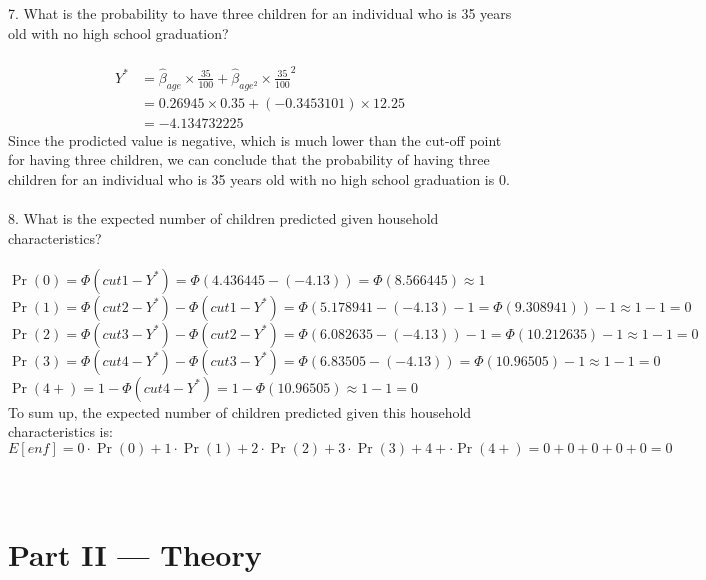 \documentclass[12pt]{article}
\begin{document}
\begin{flushleft}
7. What is the probability to have three children for an individual who is 35 years old
with no high school graduation?\\~\\
\begin{align*}
Y^*&=\hat{\beta}_{age} \times \frac{35}{100}+\hat{\beta}_{age^2} \times \frac{35}{100}^2\\
&=0.26945 \times 0.35+(-0.3453101) \times 12.25\\
&= -4.134732225
\end{align*}
Since the prodicted value is negative, which is much lower than the cut-off point for having three children, we can conclude that the probability of having three children for an individual who is 35 years old with no high school graduation is 0.\\~\\
8. What is the expected number of children predicted given household characteristics?\\~\\
$\Pr(0) = \Phi(cut1 - Y^*) = \Phi (4.436445 - (-4.13)) = \Phi(8.566445) \approx 1 $\\
$\Pr(1) = \Phi(cut2 - Y^*) - \Phi(cut1 - Y^*) = \Phi(5.178941 - (-4.13) -1 = \Phi(9.308941)) - 1 \approx 1-1=0 $\\
$\Pr(2) = \Phi(cut3 - Y^*) - \Phi(cut2 - Y^*) = \Phi( 6.082635 - (-4.13)) -1 = \Phi(10.212635)-1 \approx 1-1=0 $\\
$\Pr(3) = \Phi(cut4 - Y^*) - \Phi(cut3 - Y^*) =  \Phi( 6.83505 - (-4.13)) = \Phi(10.96505) - 1 \approx 1-1 =0$\\
$\Pr(4+) = 1 - \Phi(cut4 - Y^*) = 1-\Phi(10.96505) \approx 1-1 =0 $\\
To sum up, the expected number of children predicted given this household characteristics is:
\[
E[enf] = 0 \cdot \Pr(0) + 1 \cdot \Pr(1) + 2 \cdot \Pr(2) + 3 \cdot \Pr(3) + 4+ \cdot \Pr(4+) = 0+0+0+0+0=0
\]\\~\\
\section*{Part II --- Theory}

\end{flushleft}
\end{document}
